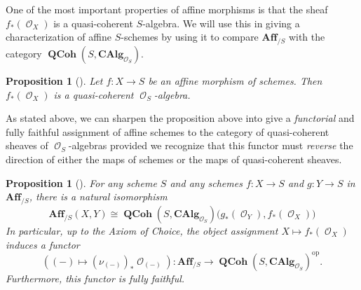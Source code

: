 \documentclass{amsart}
\newtheorem{proposition}[equation]{Proposition}
\theoremstyle{definition}
\DeclareMathOperator{\Ocal}{\mathcal{O}}
\DeclareMathOperator{\op}{op}
\newcommand{\CAlg}[1]{\mathbf{CAlg}_{#1}}
\DeclareMathOperator{\QCoh}{\mathbf{QCoh}}
\numberwithin{equation}{subsection}
\begin{document}
One of the most important properties of affine morphisms is that the sheaf $f_{\ast}(\Ocal_X)$ is a quasi-coherent $S$-algebra. We will use this in giving a characterization of affine $S$-schemes by using it to compare $\mathbf{Aff}_{/S}$ with the category $\QCoh(S,\CAlg{\Ocal_S})$.

\begin{proposition}
	[{\cite[Proposition 1.2.6]{EGA2}}]
Let $f:X \to S$ be an affine morphism of schemes. Then $f_{\ast}(\Ocal_X)$ is a quasi-coherent $\Ocal_S$-algebra.
\end{proposition}
As stated above, we can sharpen the proposition above into give a \emph{functorial} and fully faithful assignment of affine schemes to the category of quasi-coherent sheaves of $\Ocal_S$-algebras provided we recognize that this functor must \emph{reverse} the direction of either the maps of schemes or the maps of quasi-coherent sheaves.
\begin{proposition}[{\cite[Proposition 1.2.7]{EGA2}}]\label{Prop: Section Scheme Background: Affine morphisms in terms of algebra}
For any scheme $S$ and any schemes $f:X \to S$ and $g:Y \to S$ in $\mathbf{Aff}_{/S}$, there is a natural isomorphism
\[
\mathbf{Aff}_{/S}(X,Y) \cong \QCoh\left(S,\CAlg{\Ocal_S}\right)\big(g_{\ast}(\Ocal_Y), f_{\ast}(\Ocal_X)\big)
\]
In particular, up to the Axiom of Choice, the object assignment $X \mapsto f_{\ast}(\Ocal_X)$ induces a functor 
\[
\left((-) \mapsto (\nu_{(-)})_{\ast}\Ocal_{(-)}\right):\mathbf{Aff}_{/S} \to \QCoh(S,\CAlg{\Ocal_S})^{\op}.
\]
Furthermore, this functor is fully faithful.
\end{proposition}
\end{document}
